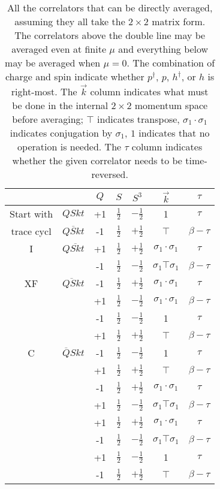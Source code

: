 \begin{table}[h]
  \centering
  \begin{tabular}{cc|ccccc}
             & & $Q$ & $S$ & $S^3$ & $\vec{k}$ & $\tau$  \\
  \hline
  Start with & $QSkt$ & +1 & $\frac{1}{2}$ & $-\frac{1}{2}$ & 1 & $\tau$ \\
  \hline
  trace cycl & $\overline{QSkt}$ & -1 & $\frac{1}{2}$ & $+\frac{1}{2}$ & $\top$ & $\beta-\tau$ \\
  \hline
  I          & $Q\overline{Sk}t$ & +1 & $\frac{1}{2}$ & $+\frac{1}{2}$ & $\sigma_1\cdot\sigma_1$ & $\tau$ \\
             & & -1 & $\frac{1}{2}$ & $-\frac{1}{2}$ & $\sigma_1\top\sigma_1$ & $\beta-\tau$ \\
  \hline\hline
  XF         & $\overline{QSk}t$ & -1 & $\frac{1}{2}$ & $+\frac{1}{2}$ & $\sigma_1\cdot\sigma_1$ & $\tau$ \\
             & & +1 & $\frac{1}{2}$ & $-\frac{1}{2}$ & $\sigma_1\cdot\sigma_1$ & $\beta-\tau$ \\
             & & -1 & $\frac{1}{2}$ & $-\frac{1}{2}$ & 1 & $\tau$ \\
             & & +1 & $\frac{1}{2}$ & $+\frac{1}{2}$ & $\top$ & $\beta-\tau$ \\
  \hline
  C          & $\overline{Q}Skt$ & -1 & $\frac{1}{2}$ & $-\frac{1}{2}$ & 1 & $\tau$ \\
             & & +1 & $\frac{1}{2}$ & $+\frac{1}{2}$ & $\top$ & $\beta-\tau$ \\
             & & -1 & $\frac{1}{2}$ & $+\frac{1}{2}$ & $\sigma_1\cdot\sigma_1$ & $\tau$ \\
             & & +1 & $\frac{1}{2}$ & $-\frac{1}{2}$ & $\sigma_1\top\sigma_1$ & $\beta-\tau$ \\
             & & +1 & $\frac{1}{2}$ & $+\frac{1}{2}$ & $\sigma_1\cdot\sigma_1$ & $\tau$ \\
             & & -1 & $\frac{1}{2}$ & $-\frac{1}{2}$ & $\sigma_1\top\sigma_1$ & $\beta-\tau$ \\
             & & +1 & $\frac{1}{2}$ & $-\frac{1}{2}$ & 1 & $\tau$ \\
             & & -1 & $\frac{1}{2}$ & $+\frac{1}{2}$ & $\top$ & $\beta-\tau$
  \end{tabular}
  \caption{All the correlators that can be directly averaged, assuming they all take the $2 \times 2$ matrix form. The correlators above the double line may be averaged even at finite $\mu$ and everything below may be averaged when $\mu = 0$. The combination of charge and spin indicate whether $p^\dagger$, $p$, $h^\dagger$, or $h$ is right-most. The $\vec{k}$ column indicates what must be done in the internal $2 \times 2$ momentum space before averaging; $\top$ indicates transpose, $\sigma_1\cdot\sigma_1$ indicates conjugation by $\sigma_1$, $1$ indicates that no operation is needed. The $\tau$ column indicates whether the given correlator needs to be time-reversed.}
  \label{tab:1psym}
\end{table}

